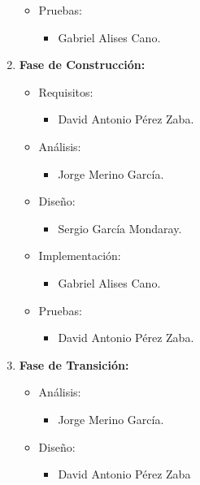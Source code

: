 \begin{enumerate}
\begin{itemize}
  \item Pruebas:
    \begin{itemize}
    \item Gabriel Alises Cano.
    \end{itemize}
  \end{itemize}

\item \textbf{Fase de Construcción:}
  \begin{itemize}
  \item Requisitos:
    \begin{itemize}
    \item David Antonio Pérez Zaba.
    \end{itemize}

  \item Análisis:
    \begin{itemize}
    \item Jorge Merino García.
    \end{itemize}
    
  \item Diseño:
    \begin{itemize}
    \item Sergio García Mondaray.
    \end{itemize}

  \item Implementación:
    \begin{itemize}
    \item Gabriel Alises Cano.
    \end{itemize}

  \item Pruebas:
    \begin{itemize}
    \item David Antonio Pérez Zaba.
    \end{itemize}
  \end{itemize}

\item \textbf{Fase de Transición:}
  \begin{itemize}

  \item Análisis:
    \begin{itemize}
    \item Jorge Merino García.
    \end{itemize}
    
  \item Diseño:
    \begin{itemize}
    \item David Antonio Pérez Zaba
    \end{itemize}


\end{itemize}
\end{enumerate}
